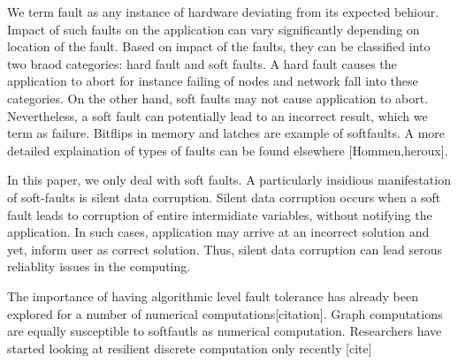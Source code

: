 We term fault as any instance of hardware deviating from its expected
behiour. Impact of such faults on the application can vary significantly
depending on location of the fault. Based on impact of the faults,
they can be classified into two braod categories: hard fault and soft
faults. A hard fault causes the application to abort for instance
failing of nodes and network fall into these categories. On the other
hand, soft faults may not cause application to abort. Nevertheless,
a soft fault can potentially lead to an incorrect result, which we
term as failure. Bitflips in memory and latches are example of softfaults.
A more detailed explaination of types of faults can be found elsewhere
{[}Hommen,heroux{]}.

In this paper, we only deal with soft faults. A particularly insidious
manifestation of soft-faults is silent data corruption. Silent data
corruption occurs when a soft fault leads to corruption of entire
intermidiate variables, without notifying the application. In such
cases, application may arrive at an incorrect solution and yet, inform
user as correct solution. Thus, silent data corruption can lead serous
reliablity issues in the computing. 

The importance of having algorithmic level fault tolerance has already
been explored for a number of numerical computations{[}citation{]}.
Graph computations are equally susceptible to softfautls as numerical
computation. Researchers have started looking at resilient discrete
computation only recently {[}cite{]}
